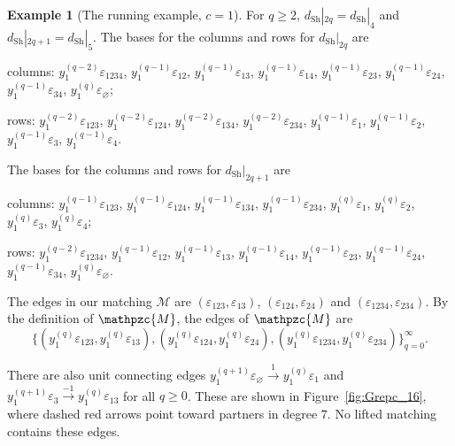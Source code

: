 \documentclass[12pt]{amsart}
\theoremstyle{plain}
\theoremstyle{definition}
\newtheorem{example}[theorem]{Example}
\newcommand{\M}{\mathcal{M}}
\newcommand{\lift}[1]{\mathpzc{#1}}
\newcommand{\Sh}{\mathrm{Sh}}
\newcommand{\eps}{\varepsilon}
\begin{document}
\begin{example}[The running example, $c = 1$]
For $q \geq 2$,
$d_{\Sh}|_{2q}= d_{\Sh}|_{4}$ and $d_{\Sh}|_{2q+1} = d_{\Sh}|_{5}$. The bases for the columns and rows for
$d_{\Sh}|_{2q}$ are \begin{center}
columns: $y_1^{(q-2)}\eps_{1234}$, $y_1^{(q-1)}\eps_{12}$, $y_1^{(q-1)}\eps_{13}$, $y_1^{(q-1)}\eps_{14}$, $y_1^{(q-1)} \eps_{23}$, $y_1^{(q-1)} \eps_{24}$, $y_1^{(q-1)} \eps_{34}$, $y_1^{(q)} \eps_\varnothing$;\end{center}
\begin{center}rows: $y_1^{(q-2)}\eps_{123}$, $y_1^{(q-2)}\eps_{124}$, $y_1^{(q-2)}\eps_{134}$, $y_1^{(q-2)}\eps_{234}$, $y_1^{(q-1)}\eps_{1}$, $y_1^{(q-1)}\eps_{2}$, $y_1^{(q-1)}\eps_{3}$, $y_1^{(q-1)}\eps_{4}$.\end{center}
The bases for the columns and rows for
$d_{\Sh}|_{2q+1}$ are \begin{center}columns: $y_1^{(q-1)}\eps_{123}$, $y_1^{(q-1)}\eps_{124}$, $y_1^{(q-1)}\eps_{134}$, $y_1^{(q-1)}\eps_{234}$, $y_1^{(q)} \eps_1$, $y_1^{(q)} \eps_2$, $y_1^{(q)} \eps_3$, $y_1^{(q)} \eps_4$;\end{center}
\begin{center} rows: $y_1^{(q-2)}\eps_{1234}$, $y_1^{(q-1)}\eps_{12}$, $y_1^{(q-1)}\eps_{13}$, $y_1^{(q-1)}\eps_{14}$, $y_1^{(q-1)}\eps_{23}$, $y_1^{(q-1)}\eps_{24}$, $y_1^{(q-1)}\eps_{34}$, $y_1^{(q)} \eps_\varnothing$.
\end{center}
The edges in our matching $\M$ are $(\eps_{123}, \eps_{13})$, $(\eps_{124}, \eps_{24})$ and $(\eps_{1234}, \eps_{234})$. By the definition of $\lift{M}$, the edges of $\lift{M}$ are $$ \{(y_1^{(q)}\eps_{123}, y_1^{(q)}\eps_{13}), (y_1^{(q)}\eps_{124}, y_1^{(q)}\eps_{24}), (y_1^{(q)}\eps_{1234}, y_1^{(q)}\eps_{234})\}_{q=0}^{\infty}.$$

There are also unit connecting edges ${y_1^{(q+1)} \eps_\varnothing \xrightarrow{1} y_1^{(q)}\eps_1}$ and ${y_1^{(q+1)} \eps_3 \xrightarrow{-1} y_1^{(q)}\eps_{13}}$ for all $q \geq 0$. These are shown in Figure~\ref{fig:Grepc_16}, where dashed red arrows point toward partners in degree $7$. No lifted matching contains these edges.


\end{example}
\end{document}
